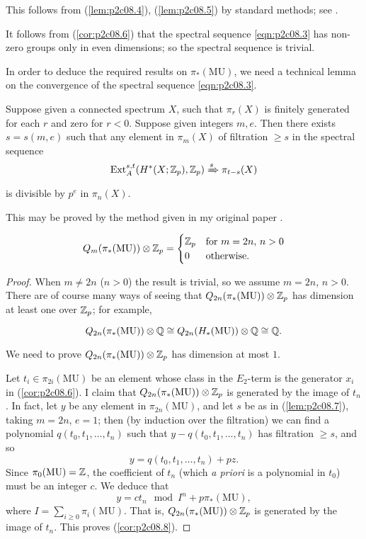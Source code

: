 \documentclass[../main]{subfiles}
\begin{document}
This follows from (\ref{lem:p2c08.4}), (\ref{lem:p2c08.5}) by standard methods; see \cite{milnor2}.

It follows from (\ref{cor:p2c08.6}) that the spectral sequence \eqref{eqn:p2c08.3} has non-zero groups only in even dimensions; so the spectral sequence is trivial.

In order to deduce the required results on $\pi_\ast(\mathrm{MU})$, we need a technical lemma on the convergence of the spectral sequence \eqref{eqn:p2c08.3}.

\begin{lemma}
\label{lem:p2c08.7}
Suppose given a connected spectrum $X$, such that $\pi_r(X)$ is finitely generated for each $r$ and zero for $r < 0$. Suppose given integers $m, e$. Then there exists $s = s(m, e)$ such that any element in $\pi_m(X)$ of filtration $\ge s$ in the spectral sequence $$\mathrm{Ext}_A^{s, t}(H^\ast(X; \mathbb{Z}_p), \mathbb{Z}_p) \xRightarrow{s} \pi_{t - s}(X)$$ is divisible by $p^e$ in $\pi_n(X)$.
\end{lemma}

This may be proved by the method given in my original paper \cite{adams}.

\begin{corollary}
\label{cor:p2c08.8}
$$Q_m(\pi_\ast(\mathrm{MU})) \otimes \mathbb{Z}_p = \begin{cases}\mathbb{Z}_p & \text {for } m = 2n, \, n > 0 \\ 0 & \text{otherwise}.\end{cases}$$ 
\end{corollary}

\begin{proof}
When $m \ne 2n$ ($n > 0$) the result is trivial, so we assume $m = 2n$, $n > 0$. There are of course many ways of seeing that $Q_{2n}(\pi_\ast(\mathrm{MU})) \otimes \mathbb{Z}_p$ has dimension at least one over $\mathbb{Z}_p$; for example, 

$$Q_{2n}(\pi_\ast(\mathrm{MU})) \otimes \mathbb{Q} \cong Q_{2n}(H_\ast(\mathrm{MU})) \otimes \mathbb{Q} \cong \mathbb{Q}.$$

We need to prove $Q_{2n}(\pi_\ast(\mathrm{MU})) \otimes \mathbb{Z}_p$ has dimension at most $1$.

Let $t_i \in \pi_{2i}(\mathrm{MU})$ be an element whose class in the $E_2$-term is the generator $x_i$ in (\ref{cor:p2c08.6}). I claim that $Q_{2n}(\pi_\ast(\mathrm {MU})) \otimes \mathbb{Z}_p$ is generated by the image of $t_n$. In fact, let $y$ be any element in $\pi_{2n}(\mathrm {MU})$, and let $s$ be as in (\ref{lem:p2c08.7}), taking $m = 2n$, $e = 1$; then (by induction over the filtration) we can find a polynomial $q(t_0, t_1, \ldots, t_n)$ such that $y - q(t_0, t_1, \ldots, t_n)$ has filtration $\ge s$, and so $$y = q(t_0, t_1, \ldots, t_n) + p z.$$ Since $\pi_0(\mathrm{MU}) = \mathbb{Z}$, the coefficient of $t_n$ (which \emph{a priori} is a polynomial in $t_0$) must be an integer $c$. We deduce that $$y = c t_n \mod I^n + p \pi_\ast(\mathrm{MU}),$$ where $\displaystyle I = \sum_{i \ge 0} \pi_i(\mathrm{MU}).$ That is, $Q_{2n}(\pi_\ast(\mathrm{MU})) \otimes \mathbb{Z}_p$ is generated by the image of $t_n$. This proves (\ref{cor:p2c08.8}).
\end{proof}
\end{document}
